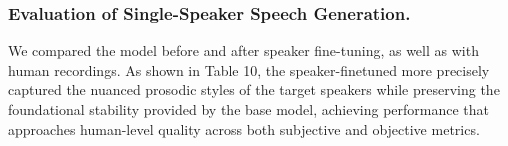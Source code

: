\subsubsection{Evaluation of Single-Speaker Speech Generation.}
We compared the \method model before and after speaker fine-tuning, as well as with human recordings. As shown in Table 10, the speaker-finetuned \method more precisely captured the nuanced prosodic styles of the target speakers while preserving the foundational stability provided by the base model, achieving performance that approaches human-level quality across both subjective and objective metrics.